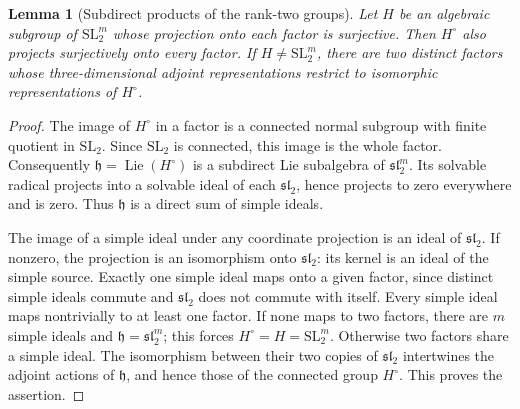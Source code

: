 \documentclass[11pt,a4paper]{article}
\newtheorem{lemma}[theorem]{Lemma}
\theoremstyle{definition}
\theoremstyle{remark}
\numberwithin{equation}{section}
\begin{document}
\begin{lemma}[Subdirect products of the rank-two groups]
\label{mpj:lie}
Let $H$ be an algebraic subgroup of $\mathrm{SL}_2^m$ whose
projection onto each factor is surjective. Then $H^\circ$ also
projects surjectively onto every factor. If
$H\ne\mathrm{SL}_2^m$, there are two distinct factors whose
three-dimensional adjoint representations restrict to isomorphic
representations of $H^\circ$.
\end{lemma}
\begin{proof}
The image of $H^\circ$ in a factor is a connected normal subgroup
with finite quotient in $\mathrm{SL}_2$. Since $\mathrm{SL}_2$
is connected, this image is the whole factor. Consequently
$\mathfrak h=\operatorname{Lie}(H^\circ)$ is a subdirect Lie
subalgebra of $\mathfrak{sl}_2^m$.
Its solvable radical projects into a solvable ideal of each
$\mathfrak{sl}_2$, hence projects to zero everywhere and is zero.
Thus $\mathfrak h$ is a direct sum of simple ideals.

The image of a simple ideal under any coordinate projection is
an ideal of $\mathfrak{sl}_2$. If nonzero, the projection is an
isomorphism onto $\mathfrak{sl}_2$: its kernel is an ideal of the
simple source. Exactly one simple ideal maps onto a given factor,
since distinct simple ideals commute and $\mathfrak{sl}_2$ does
not commute with itself. Every simple ideal maps nontrivially to
at least one factor. If none maps to two factors, there are $m$
simple ideals and $\mathfrak h=\mathfrak{sl}_2^m$; this forces
$H^\circ=H=\mathrm{SL}_2^m$.
Otherwise two factors share a simple ideal. The isomorphism
between their two copies of $\mathfrak{sl}_2$ intertwines the
adjoint actions of $\mathfrak h$, and hence those of the connected
group $H^\circ$. This proves the assertion.
\end{proof}
\end{document}
